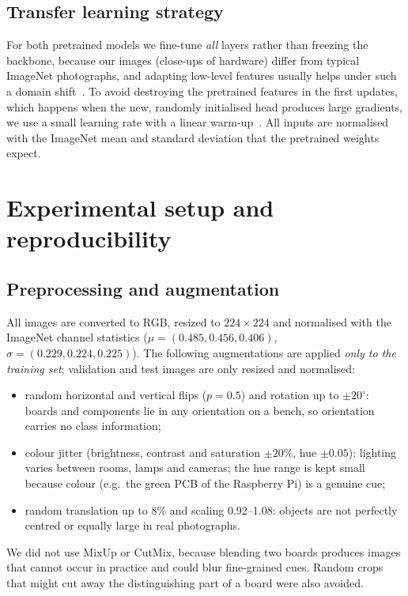 \documentclass[11pt,a4paper]{article}
\begin{document}
\subsection{Transfer learning strategy}
For both pretrained models we fine-tune \emph{all} layers rather than freezing the backbone, because our images (close-ups of hardware) differ from typical ImageNet photographs, and adapting low-level features usually helps under such a domain shift~\cite{yosinski2014,kornblith2019}. To avoid destroying the pretrained features in the first updates, which happens when the new, randomly initialised head produces large gradients, we use a small learning rate with a linear warm-up~\cite{goyal2017}. All inputs are normalised with the ImageNet mean and standard deviation that the pretrained weights expect.

\section{Experimental setup and reproducibility}\label{sec:setup}
\subsection{Preprocessing and augmentation}
All images are converted to RGB, resized to $224\times224$ and normalised with the ImageNet channel statistics ($\mu=(0.485,0.456,0.406)$, $\sigma=(0.229,0.224,0.225)$). The following augmentations are applied \emph{only to the training set}; validation and test images are only resized and normalised:
\begin{itemize}
  \item random horizontal and vertical flips ($p=0.5$) and rotation up to $\pm20^\circ$: boards and components lie in any orientation on a bench, so orientation carries no class information;
  \item colour jitter (brightness, contrast and saturation $\pm20\%$, hue $\pm0.05$): lighting varies between rooms, lamps and cameras; the hue range is kept small because colour (e.g.\ the green PCB of the Raspberry Pi) is a genuine cue;
  \item random translation up to 8\% and scaling 0.92--1.08: objects are not perfectly centred or equally large in real photographs.
\end{itemize}
We did not use MixUp or CutMix, because blending two boards produces images that cannot occur in practice and could blur fine-grained cues. Random crops that might cut away the distinguishing part of a board were also avoided.
\end{document}
